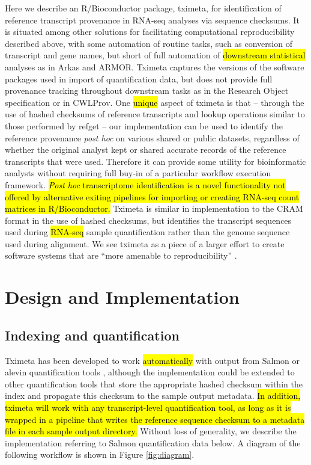 Here we describe an R/Bioconductor package, tximeta, for
identification of reference transcript provenance in RNA-seq analyses
via sequence checksums. It is situated among other solutions for
facilitating computational reproducibility described above, with some
automation of routine tasks, such as conversion of transcript and gene
names, but short of full automation of \hl{downstream statistical} analyses
as in Arkas and ARMOR. Tximeta captures the versions of the software
packages used in import of quantification data, but does not provide
full provenance tracking throughout downstream tasks as in the
Research Object specification or in CWLProv. One \hl{unique} aspect of
tximeta is that -- through the use of hashed checksums of reference
transcripts and lookup operations similar to those performed by refget
-- our implementation can be used to identify the reference provenance
\textit{post hoc} on various shared or public datasets, regardless of
whether the original analyst kept or shared accurate records of the
reference transcripts that were used. Therefore it can provide some
utility for bioinformatic analysts without requiring full buy-in of a
particular workflow execution framework.
\hl{\textit{Post hoc} transcriptome identification is a novel
functionality not offered by alternative exiting pipelines for
importing or creating RNA-seq count matrices in R/Bioconductor.}
Tximeta is similar in implementation to the CRAM format in the use of
hashed checksums, but identifies the transcript sequences used during
\hl{RNA-seq} sample quantification rather than the genome sequence
used during alignment. We see tximeta as a piece of a larger effort to
create software systems that are ``more amenable to reproducibility''
\cite{Peng2011}.

\section*{Design and Implementation}

\subsection*{Indexing and quantification}

Tximeta has been developed to work \hl{automatically} with output from
Salmon or alevin quantification tools \cite{salmon,alevin},
although the implementation could be extended to other quantification
tools that store the appropriate hashed checksum within the index and
propagate this checksum to the sample output metadata.
\hl{In addition, tximeta will work with any transcript-level
quantification tool, as long as it is wrapped in a pipeline that
writes the reference sequence checksum to a metadata file in each
sample output directory.} Without loss of generality, we
describe the implementation referring to Salmon quantification data
below. A diagram of the following workflow is shown in Figure
\ref{fig:diagram}. 

